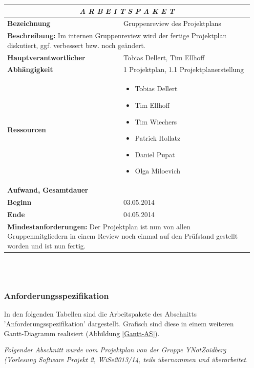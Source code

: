 \documentclass[fontsize=12pt,paper=a4,twoside]{scrartcl}
\begin{document}
\begin{tabular}{p{7.5cm}|p{7.5cm}}\toprule
\multicolumn{2}{c}{\textbf{\textit{A R B E I T S P A K E T \quad 1.2}}} \\ \toprule \hline
\textbf{Bezeichnung} & Gruppenreview des Projektplans\\\hline
\multicolumn{2}{p{15cm}}{\textbf{Beschreibung:} \newline 
Im internen Gruppenreview wird der fertige Projektplan diskutiert, ggf. verbessert bzw. noch geändert.}  \\\hline
\textbf{Hauptverantwortlicher} & Tobias Dellert, Tim Ellhoff \\\hline
\textbf{Abhängigkeit} & 1 Projektplan, 1.1 Projektplanerstellung\\\hline
\textbf{Ressourcen} & \begin{itemize}
\itemsep0pt
\item Tobias Dellert
\item Tim Ellhoff
\item Tim Wiechers
\item Patrick Hollatz
\item Daniel Pupat
\item Olga Miloevich
\end{itemize} \\\hline
\textbf{Aufwand, Gesamtdauer} & \\\hline
\textbf{Beginn} & 03.05.2014 \\\hline
\textbf{Ende} & 04.05.2014\\\hline
\multicolumn{2}{p{15cm}}{\textbf{Mindestanforderungen: } \newline
Der Projektplan ist nun von allen Gruppenmitgliedern in einem Review noch einmal auf den Prüfstand gestellt worden und ist nun fertig. }  \\ \toprule
\end{tabular} \\\\

\subsubsection{Anforderungsspezifikation}\label{aps}

In den folgenden Tabellen sind die Arbeitspakete des Abschnitts 'Anforderungsspezifikation' dargestellt. Grafisch sind diese in einem weiteren Gantt-Diagramm realisiert (Abbildung \ref{Gantt-AS}).

\textit{Folgender Abschnitt wurde vom Projektplan von der Gruppe YNotZoidberg (Vorlesung Software Projekt 2, WiSe2013/14, teils übernommen und überarbeitet.}
\end{document}
